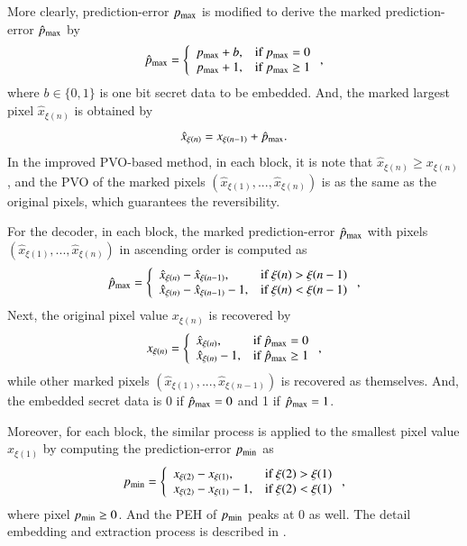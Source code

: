 \documentclass[review,3p,10pt,sort&compress]{elsarticle}
\begin{document}
More clearly, prediction-error $p_{\rm max}$ is modified to derive the marked prediction-error $\hat{p}_{\rm max}$ by
\begin{equation}\label{eq:mpmax}
\hat{p}_{\rm max} = \left\{\begin{array}{ll}
p_{\rm max} + b, & \text{if } p_{\rm max}=0 \\
p_{\rm max} + 1, & \text{if } p_{\rm max}\geq 1 \\
\end{array}\right.,
\end{equation}
where $b \in \{0,1\}$ is one bit secret data to be embedded. And, the marked largest pixel $\hat{x}_{\xi(n)}$ is obtained by
\begin{equation}\label{eq:mpixel}
\hat{x}_{\xi(n)} = x_{\xi(n-1)} + \hat{p}_{\rm max}.
\end{equation}
In the improved PVO-based method, in each block, it is note that $\hat{x}_{\xi(n)} \geq x_{\xi(n)}$, and the PVO of the marked pixels $(\hat{x}_{\xi(1)},...,\hat{x}_{\xi(n)})$ is as the same as the original pixels, which guarantees the reversibility.

For the decoder, in each block, the marked prediction-error $\hat{p}_{\rm max}$ with pixels $(\hat{x}_{\xi(1)},...,\hat{x}_{\xi(n)})$ in ascending order is computed as
\begin{equation}\label{eq:dmpmax}
\hat{p}_{\rm max} = \left\{\begin{array}{ll}
\hat{x}_{\xi(n)} - \hat{x}_{\xi(n-1)},      & \text{if } \xi(n) > \xi(n-1) \\
\hat{x}_{\xi(n)} - \hat{x}_{\xi(n-1)} - 1,  & \text{if } \xi(n) < \xi(n-1)
\end{array}\right.,
\end{equation}
Next, the original pixel value $x_{\xi(n)}$ is recovered by
\begin{equation}\label{eq:dmpixel}
x_{\xi(n)} = \left\{\begin{array}{ll}
\hat{x}_{\xi(n)},       & \text{if } \hat{p}_{\rm max} = 0 \\
\hat{x}_{\xi(n)} - 1,   & \text{if } \hat{p}_{\rm max} \geq 1 \\
\end{array}\right.,
\end{equation}
while other marked pixels $(\hat{x}_{\xi(1)},...,\hat{x}_{\xi(n-1)})$ is recovered as themselves. And, the embedded secret data is 0 if $\hat{p}_{\rm max} = 0$ and 1 if $\hat{p}_{\rm max} = 1$.

Moreover, for each block, the similar process is applied to the smallest pixel value $x_{\xi(1)}$ by computing the prediction-error $p_{\rm min}$ as
\begin{equation}\label{eq:pmin}
p_{\rm min} = \left\{\begin{array}{ll}
x_{\xi(2)} - x_{\xi(1)},      & \text{if } \xi(2) > \xi(1) \\
x_{\xi(2)} - x_{\xi(1)} - 1,  & \text{if } \xi(2) < \xi(1)
\end{array}\right.,
\end{equation}
where pixel $p_{\rm min} \geq 0$. And the PEH of $p_{\rm min}$ peaks at 0 as well. The detail embedding and extraction process is described in \cite{Peng2014IPVO}.
\end{document}
